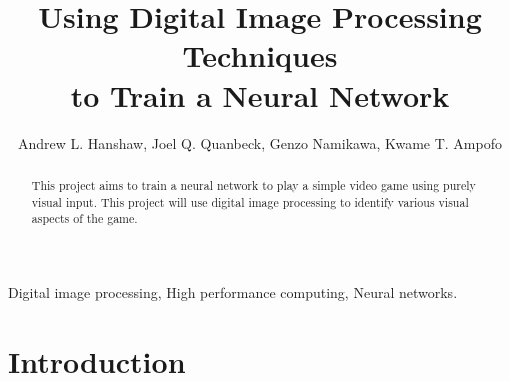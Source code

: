 %
%
\title{Using Digital Image Processing Techniques\\to Train a Neural Network}

\author{Andrew L. Hanshaw, Joel Q. Quanbeck, Genzo Namikawa, Kwame T. Ampofo}%

\maketitle


\begin{abstract}
This project aims to train a neural network to play a simple video game using purely visual input. This project will use digital image processing to identify various visual aspects of the game.
\end{abstract}

\begin{IEEEkeywords}
Digital image processing, High performance computing, Neural networks.
\end{IEEEkeywords}

\section{Introduction}\label{sec:intro}

